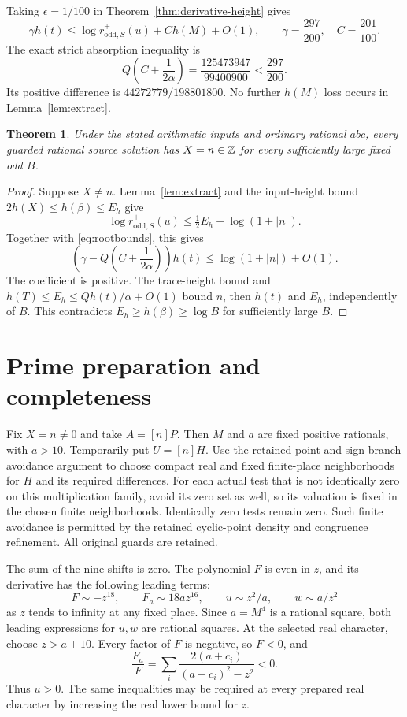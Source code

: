\documentclass[11pt,a4paper]{article}
\newtheorem{theorem}{Theorem}[section]
\begin{document}
Taking $\epsilon=1/100$ in Theorem~\ref{thm:derivative-height} gives
\[
 \gamma h(t)\le\log r^+_{\mathrm{odd},S}(u)+C h(M)+O(1),\qquad
             \gamma=\frac{297}{200},\quad C=\frac{201}{100}.
\]
The exact strict absorption inequality is
\begin{equation}\label{eq:strict}
 Q\left(C+\frac1{2\alpha}\right)
       =\frac{125473947}{99400900}<\frac{297}{200}.
\end{equation}
Its positive difference is $44272779/198801800$.
No further $h(M)$ loss occurs in Lemma~\ref{lem:extract}.

\begin{theorem}\label{thm:sound}
Under the stated arithmetic inputs and ordinary rational $abc$,
every guarded rational source solution has $X=n\in\mathbb Z$ for every
sufficiently large fixed odd $B$.
\end{theorem}
\begin{proof}
Suppose $X\ne n$. Lemma~\ref{lem:extract} and the input-height bound
$2h(X)\le h(\beta)\le E_h$ give
\[
 \log r^+_{\mathrm{odd},S}(u)
           \le\tfrac12 E_h+\log(1+|n|).
\]
Together with \eqref{eq:rootbounds}, this gives
\[
 \left(\gamma-Q\left(C+\frac1{2\alpha}\right)\right)h(t)
                          \le\log(1+|n|)+O(1).
\]
The coefficient is positive. The trace-height bound and
$h(T)\le E_h\le Qh(t)/\alpha+O(1)$ bound $n$, then $h(t)$ and
$E_h$, independently of $B$. This contradicts
$E_h\ge h(\beta)\ge\log B$ for sufficiently large $B$.
\end{proof}

\section{Prime preparation and completeness}

Fix $X=n\ne0$ and take $A=[n]P$. Then $M$ and $a$ are fixed positive
rationals, with $a>10$. Temporarily put $U=[n]H$. Use the retained
point and sign-branch avoidance argument to choose compact real and
fixed finite-place neighborhoods for $H$ and its required differences.
For each actual test that is not identically zero on this multiplication
family, avoid its zero set as well, so its valuation is fixed in the
chosen finite neighborhoods. Identically zero tests remain zero.
Such finite avoidance is permitted by the retained cyclic-point density
and congruence refinement. All original guards are retained.

The sum of the nine shifts is zero. The polynomial $F$ is even
in $z$, and its derivative has the following leading terms:
\begin{equation}\label{eq:asymptotics}
 F\sim-z^{18},\qquad F_a\sim18a z^{16},\qquad
 u\sim z^2/a,\qquad w\sim a/z^2
\end{equation}
as $z$ tends to infinity at any fixed place.
Since $a=M^4$ is a rational square, both leading expressions for
$u,w$ are rational squares.
At the selected real character, choose $z>a+10$.
Every factor of $F$ is negative, so $F<0$, and
\[
 \frac{F_a}{F}=\sum_i\frac{2(a+c_i)}{(a+c_i)^2-z^2}<0.
\]
Thus $u>0$. The same inequalities may be required at every prepared
real character by increasing the real lower bound for $z$.
\end{document}
